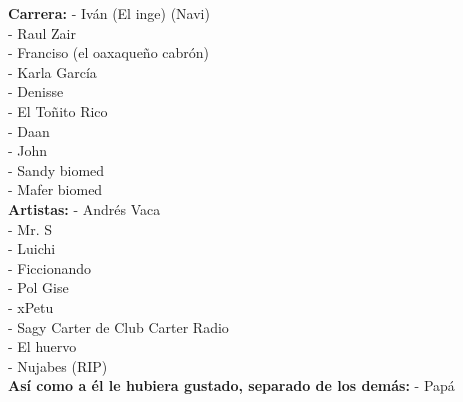 \textbf{Carrera:}
- Iván (El inge) (Navi)\\
- Raul Zair\\
- Franciso (el oaxaqueño cabrón)\\
- Karla García\\
- Denisse\\
- El Toñito Rico\\
- Daan\\
- John\\
- Sandy biomed\\
- Mafer biomed\\

\textbf{Artistas:}
- Andrés Vaca\\
- Mr. S\\
- Luichi\\
- Ficcionando\\
- Pol Gise\\
- xPetu\\
- Sagy Carter de Club Carter Radio\\
- El huervo\\
- Nujabes (RIP)\\

\textbf{Así como a él le hubiera gustado, separado de los demás:}
- Papá\\